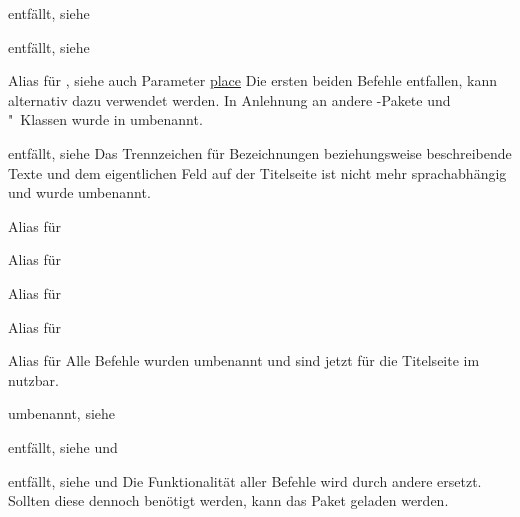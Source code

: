 \documentclass[%
  english,ngerman,%
  headings=optiontoheadandtoc,captions=tableheading,numbers=noenddot,%
  chapterpage,cdfoot,%
]{tudscrman}
\begin{document}
\begin{Declaration}{}{%
  entfällt, siehe %
}
\begin{Declaration}{}{%
  entfällt, siehe %
}
\begin{Declaration}{}{%
  Alias für , siehe auch Parameter \hyperref[idx:keys]{place}%
}
\printdeclarationlist*%
%
Die ersten beiden Befehle entfallen,  kann alternativ dazu 
verwendet werden. In Anlehnung an andere -Pakete und "~Klassen 
wurde  in  umbenannt.
\end{Declaration}
\end{Declaration}
\end{Declaration}

\begin{Declaration}{}{%
  entfällt, siehe %
}
\printdeclarationlist*%
%
Das Trennzeichen für Bezeichnungen beziehungsweise beschreibende Texte und dem 
eigentlichen Feld auf der Titelseite ist nicht mehr sprachabhängig und wurde 
umbenannt.
\end{Declaration}

\begin{Declaration}{}{%
  Alias für %
}
\begin{Declaration}{}{%
  Alias für %
}
\begin{Declaration}{}{%
  Alias für 
}
\begin{Declaration}{}{%
  Alias für 
}
\begin{Declaration}{}{%
  Alias für %
}
\printdeclarationlist*%
%
Alle Befehle wurden umbenannt und sind jetzt für die Titelseite im \CD nutzbar.
\end{Declaration}
\end{Declaration}
\end{Declaration}
\end{Declaration}
\end{Declaration}

\begin{Declaration}{}{%
  umbenannt, siehe %
}
\begin{Declaration}{}{%
  entfällt, siehe  und %
}
\begin{Declaration}{}{%
  entfällt, siehe  und %
}
\printdeclarationlist*%
%
Die Funktionalität aller Befehle wird durch andere ersetzt. Sollten diese 
dennoch benötigt werden, kann das Paket  geladen werden.
\end{Declaration}
\end{Declaration}
\end{Declaration}
\end{document}
